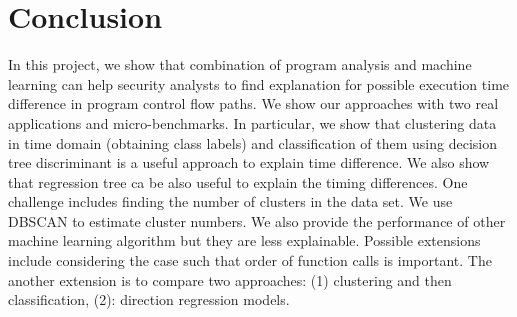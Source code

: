 \documentclass{article}
\begin{document}
\section{Conclusion}
In this project, we show that combination of program analysis and machine learning can help
security analysts to find explanation for possible execution time difference in program
control flow paths. We show our approaches with two real applications and micro-benchmarks.
In particular, we show that clustering data in time domain (obtaining class labels) and classification
of them using decision tree discriminant is a useful approach to explain time difference.
We also show that regression tree ca be also useful to explain the timing differences. 
One challenge includes finding the number of clusters in the data set. We use DBSCAN to
estimate cluster numbers. We also provide the performance of other machine learning algorithm but they are less explainable. Possible extensions include considering the case such
that order of function calls is important. The another extension is to compare two approaches: (1) clustering and then classification, (2): direction regression models.
\end{document}
